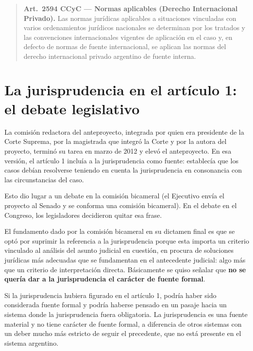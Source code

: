 \documentclass[12pt,oneside]{book}
\begin{document}
\begin{quote}
\textbf{Art.~2594 CCyC --- Normas aplicables (Derecho Internacional Privado).} Las normas jurídicas aplicables a situaciones vinculadas con varios ordenamientos jurídicos nacionales se determinan por los tratados y las convenciones internacionales vigentes de aplicación en el caso y, en defecto de normas de fuente internacional, se aplican las normas del derecho internacional privado argentino de fuente interna.
\end{quote}

\section{La jurisprudencia en el artículo 1: el debate legislativo}

La comisión redactora del anteproyecto, integrada por quien era presidente de la Corte Suprema, por la magistrada que integró la Corte y por la autora del proyecto, terminó su tarea en marzo de 2012 y elevó el anteproyecto. En esa versión, el artículo 1 incluía a la jurisprudencia como fuente: establecía que los casos debían resolverse teniendo en cuenta la jurisprudencia en consonancia con las circunstancias del caso.

Esto dio lugar a un debate en la comisión bicameral (el Ejecutivo envía el proyecto al Senado y se conforma una comisión bicameral). En el debate en el Congreso, los legisladores decidieron quitar esa frase.

El fundamento dado por la comisión bicameral en su dictamen final es que se optó por suprimir la referencia a la jurisprudencia porque esta importa un criterio vinculado al análisis del asunto judicial en cuestión, en procura de soluciones jurídicas más adecuadas que se fundamentan en el antecedente judicial: algo más que un criterio de interpretación directa. Básicamente se quiso señalar que \textbf{no se quería dar a la jurisprudencia el carácter de fuente formal}.

\begin{important}
Si la jurisprudencia hubiera figurado en el artículo 1, podría haber sido considerada fuente formal y podría haberse pensado en un pasaje hacia un sistema donde la jurisprudencia fuera obligatoria. La jurisprudencia es una fuente material y no tiene carácter de fuente formal, a diferencia de otros sistemas con un deber mucho más estricto de seguir el precedente, que no está presente en el sistema argentino.
\end{important}
\end{document}
